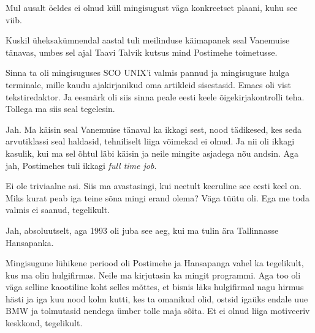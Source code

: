 Mul ausalt öeldes ei olnud küll mingisugust väga konkreetset plaani, kuhu see 
viib.

Kuskil üheksakümnendal aastal tuli meilinduse käimapanek seal Vanemuise tänavas, 
umbes sel ajal Taavi Talvik 
kutsus mind Postimehe toimetusse.

Sinna ta oli mingisuguses SCO UNIX'i valmis pannud ja 
mingisuguse hulga terminale, mille kaudu ajakirjanikud oma artikleid 
sisestasid. Emacs oli vist tekstiredaktor. Ja eesmärk oli siis sinna peale eesti keele 
õigekirjakontrolli teha. Tollega ma siis seal tegelesin. 


Jah. Ma käisin seal Vanemuise tänaval ka ikkagi sest,  nood 
tädikesed, kes seda arvutiklassi seal haldasid, tehniliselt liiga võimekad ei 
olnud. Ja nii oli ikkagi kasulik, kui ma sel õhtul läbi käisin ja neile mingite 
asjadega nõu andsin. Aga jah, Postimehes tuli ikkagi \emph{full time job}.


Ei ole triviaalne asi. Siis ma avastasingi, kui neetult keeruline see eesti 
keel on. Miks kurat peab iga teine sõna mingi erand olema? Väga tüütu oli. Ega 
me toda valmis ei saanud, tegelikult.


Jah, absoluutselt, aga  1993 oli juba see aeg, kui ma tulin ära Tallinnasse 
Hansapanka.


Mingisugune lühikene periood oli Postimehe ja Hansapanga vahel ka tegelikult, 
kus ma olin  hulgifirmas. Neile ma  kirjutasin ka mingit programmi. 
Aga too oli väga selline kaootiline koht selles mõttes, et  bisnis läks 
hulgifirmal nagu hirmus hästi ja iga kuu nood kolm kutti, kes ta omanikud olid, 
ostsid igaüks endale uue BMW ja tolmutasid nendega ümber tolle maja sõita. Et 
ei olnud liiga motiveeriv keskkond, tegelikult.

